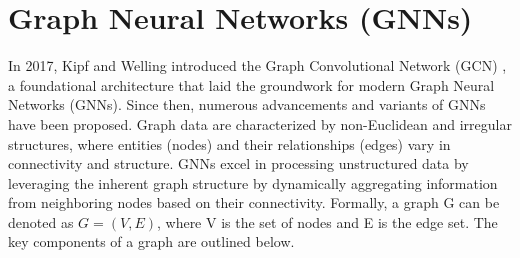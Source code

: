 \section{Graph Neural Networks (GNNs)} \label{gnnse}
In 2017, Kipf and Welling introduced the Graph Convolutional Network (GCN) \cite{kipf}, a foundational architecture that laid the groundwork for modern Graph Neural Networks (GNNs). Since then, numerous advancements and variants of GNNs have been proposed. Graph data are characterized by non-Euclidean and irregular structures, where entities (nodes) and their relationships (edges) vary in connectivity and structure. GNNs excel in processing unstructured data by leveraging the inherent graph structure by dynamically aggregating information from neighboring nodes based on their connectivity. Formally, a graph \gls{G} can be denoted as \( G = (V, E) \), where \gls{V} is the set of nodes and \gls{E} is the edge set. The key components of a graph are outlined below.
